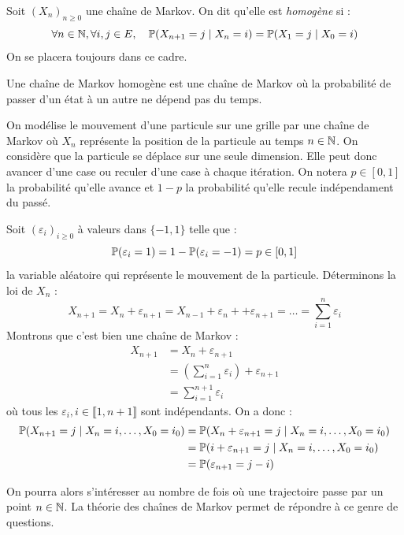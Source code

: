 \begin{definition}
    Soit $(X_n)_{n \geqslant 0}$ une chaîne de Markov. On dit qu'elle est \emph{homogène} si : 
        \[ \forall n \in \mathbb{N}, \forall i,j \in E, \quad \mathbb{P} (X_{n+1} = j \; | \; X_n = i) = \mathbb{P}(X_1 = j \; | \; X_0 = i) \]
    On se placera toujours dans ce cadre.
\end{definition}

\begin{remark}
    Une chaîne de Markov homogène est une chaîne de Markov où la probabilité de passer d'un état à un autre ne dépend pas du temps. 
\end{remark}

\begin{example}
    On modélise le mouvement d'une particule sur une grille par une chaîne de Markov où $X_n$ représente 
    la position de la particule au temps $n \in  \mathbb{N}$. On considère que la particule se déplace sur une 
    seule dimension. Elle peut donc avancer d'une case ou reculer d'une case à chaque itération. On notera 
    $ p \in [0,1]$ la probabilité qu'elle avance et $1-p$ la probabilité qu'elle recule indépendament du passé. 
    
    Soit $ (\varepsilon_i)_{i \geqslant 0}$ à valeurs dans $\{-1, 1\}$ telle que : 
        \[ \mathbb{P}( \varepsilon_i = 1) = 1 - \mathbb{P}( \varepsilon_i = -1) = p \in [0,1] \]
    la variable aléatoire qui représente le mouvement de la particule.  
    Déterminons la loi de $X_n$ :
        \[ 
            X_{n+1} = X_n + \varepsilon_{n+1} 
            = X_{n-1} + \varepsilon_n + + \varepsilon_{n+1} 
            = \dots 
            = \sum_{i=1}^{n} \varepsilon_i 
        \] 
    Montrons que c'est bien une chaîne de Markov : 
        \begin{align*}
            X_{n+1} &= X_n + \varepsilon_{n+1} \\ 
            &= \left( \sum_{i=1}^{n} \varepsilon_i \right) + \varepsilon_{n+1} \\ 
            &= \sum_{i=1}^{n+1} \varepsilon_i 
        \end{align*}
    où tous les $ \varepsilon_i, i \in \llbracket 1, n+1 \rrbracket $ sont indépendants. 
    On a donc : 
        \begin{align*}
            \mathbb{P}(X_{n+1} = j \; | \; X_n = i, \dots, X_0 = i_0) &= \mathbb{P}(X_n + \varepsilon_{n+1} = j \; | \; X_n = i, \dots, X_0 = i_0) \\ 
            &= \mathbb{P}(i + \varepsilon_{n+1} = j \; | \; X_n = i, \dots, X_0 = i_0) \\ 
            &= \mathbb{P}( \varepsilon_{n+1} = j - i) 
        \end{align*}

    On pourra alors s'intéresser au nombre de fois où une trajectoire passe par un point $n \in \mathbb{N}$. 
    La théorie des chaînes de Markov permet de répondre à ce genre de questions. 
\end{example}

